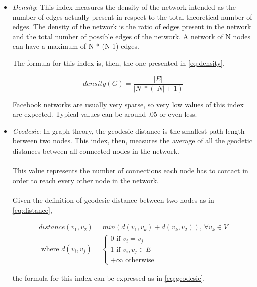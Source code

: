 \begin{itemize}

\item \emph{Density}: This index measures the density of the network intended as the number of edges actually present in respect to the total theoretical number of edges.
The density of the network is the ratio of edges present in the network and the total number of possible edges of the network.
A network of N nodes can have a maximum of N * (N-1) edges.

The formula for this index is, then, the one presented in \ref{eq:density}.

\begin{equation}
density(G) = 
\frac{\left | E \right |}
{\left | N \right | * \left ( \left | N \right | + 1 \right )}
\label{eq:density}
\end{equation}

Facebook networks are usually very sparse, so very low values of this index are expected.
Typical values can be around .05 or even less.

\item \emph{Geodesic}: In graph theory, the geodesic distance is the smallest path length between two nodes.
This index, then, measures the average of all the geodetic distances between all connected nodes in the network.\\
\\
This value represents the number of connections each node has to contact in order to reach every other node in the network.\\
\\
Given the definition of geodesic distance between two nodes as in \ref{eq:distance},

\begin{equation}
\begin{split}
distance(v_{1}, v_{2}) = min\left ( d(v_{1}, v_{k}) + d(v_{k}, v_{2}) \right )
\textrm{, } \forall v_{k} \in V \\
\textrm{ where }
d(v_{i}, v_{j})=\left \{
\begin{matrix}
0 \textrm{ if } v_{i} = v_{j} \\
1 \textrm{ if } v_{i}, v_{j} \in E \\
+\infty \textrm{ otherwise}
\end{matrix}
\right.
\end{split}
\label{eq:distance}
\end{equation}

the formula for this index can be expressed as in \ref{eq:geodesic}.


\end{itemize}
